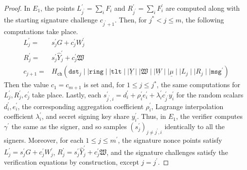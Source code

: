 \documentclass[11pt]{article}
\theoremstyle{definition}
\newcommand{\lt}{\texttt{lt}}
\newcommand{\tlt}{\texttt{tlt}}
\newcommand{\ring}{\texttt{ring}}
\newcommand{\VK}{\underline{\texttt{vk}}}
\newcommand{\dst}{\texttt{dst}}
\newcommand{\msg}{\texttt{msg}}
\newcommand{\preproc}{\texttt{PreProc}}
\begin{document}
\begin{proof}
In $E_1$, the points $L_{j^\prime}^\prime = \sum_i F_i$ and $R_{j^\prime}^\prime = \sum_i F_i^\prime$ are computed along with the starting signature challenge $c_{j^\prime+1}$.
Then, for $j^* < j \leq m$, the following computations take place.
\begin{align*}
L_j^\prime =& s_j^\prime G + c_j^\prime W_j^\prime \\
R_j^\prime =& s_j^\prime \widehat{Y}_j^\prime + c_j^\prime \mathfrak{W} \\
c_{j+1} =& H_{\texttt{ch}}(\texttt{dst}_{j} \mid \mid \ring \mid \mid \tlt \mid \mid \underline{\widehat{Y}} \mid \mid \mathfrak{W} \mid \mid \underline{W} \mid \mid \underline{\mu} \mid \mid L_{j} \mid \mid R_{j} \mid \mid \msg^\prime)
\end{align*}
Then the value $c_1 = c_{m+1}$ is set and, for $1 \leq j \leq j^*$, the same computations for $L_j^\prime, R_j^\prime, c_j^\prime$ take place. Lastly, each $s_{j^\prime, i}^\prime = d_i^\prime + \rho_i^\prime e_i^\prime + \lambda_i^\prime c_{j^\prime}^\prime y_i^\prime$ for the random scalars $d_i^\prime, e_i^\prime$, the corresponding aggregation coefficient $\rho_i^\prime$, Lagrange interpolation coefficient $\lambda_i^\prime$, and secret signing key share $y_i^\prime$.
Thus, in $E_1$, the verifier computes $\gamma^\prime$ the same as the signer, and so samples $(s_j^\prime)_{j\neq j^\prime,i}$ identically to all the signers. Moreover, for each $1 \leq j \leq m^\prime$, 
the signature nonce points satisfy $L_j^\prime = s_j^\prime G + c_j^\prime W_j^\prime$, $R_j^\prime = s_j^\prime \widehat{Y}_j^\prime + c_j^\prime \mathfrak{W}$, and the signature challenges satisfy the verification equations by construction, except $j=j^\prime$. 


\end{proof}
\end{document}

